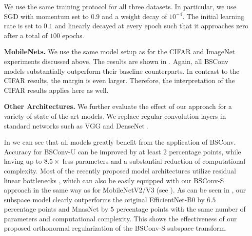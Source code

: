 \documentclass[10pt,twocolumn,letterpaper]{article}
\newcommand{\DCCK}{BSConv\xspace}
\newcommand{\DCCKU}{\DCCK-U\xspace}
\newcommand{\DCCKS}{\DCCK-S\xspace}
\begin{document}
We use the same training protocol for all three datasets.
In particular, we use SGD with momentum set to $0.9$ and a weight decay of $10^{-4}$.
The initial learning rate is set to $0.1$ and linearly decayed at every epoch such that it approaches zero after a total of $100$ epochs.

\textbf{MobileNets.}
We use the same model setup as for the \mbox{CIFAR} and ImageNet experiments discussed above.
The results are shown in .
Again, all \DCCK models substantially outperform their baseline counterparts.
In contrast to the CIFAR results, the margin is even larger.
Therefore, the interpretation of the CIFAR results applies here as well.

\textbf{Other Architectures.}
We further evaluate the effect of our approach for a variety of state-of-the-art models.
We replace regular convolution layers in standard networks such as VGG \cite{simonyan2014very} and DenseNet \cite{huang2017densely}.

In  we can see that all models greatly benefit from the application of \DCCK.
Accuracy for \DCCKU can be improved by at least 2 percentage points, while having up to $8.5 \times$ less parameters and a substantial reduction of computational complexity.
Most of the recently proposed model architectures utilize residual linear bottlenecks \cite{sandler2018mobilenetv2}, which can also be easily equipped with our \DCCKS approach in the same way as for MobileNetV2/V3 (see ).
As can be seen in , our subspace model clearly outperforms the original EfficientNet-B0 \cite{tan2019efficientnet} by $6.5$ percentage points and MnasNet \cite{tan2019mnasnet} by $5$ percentage points with the same number of parameters and computational complexity.
This shows the effectiveness of our proposed orthonormal regularization of the \DCCKS subspace transform.
\end{document}
